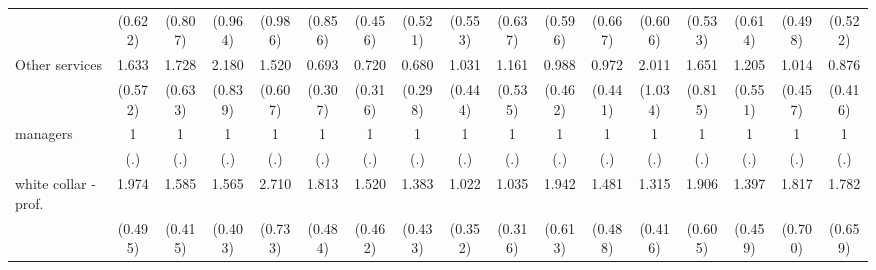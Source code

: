 {\begin{tabular}{l*{16}{c}}
                    &     (0.622)         &     (0.807)         &     (0.964)         &     (0.986)         &     (0.856)         &     (0.456)         &     (0.521)         &     (0.553)         &     (0.637)         &     (0.596)         &     (0.667)         &     (0.606)         &     (0.533)         &     (0.614)         &     (0.498)         &     (0.522)         \\
[1em]
Other services      &       1.633         &       1.728         &       2.180\sym{*}  &       1.520         &       0.693         &       0.720         &       0.680         &       1.031         &       1.161         &       0.988         &       0.972         &       2.011         &       1.651         &       1.205         &       1.014         &       0.876         \\
                    &     (0.572)         &     (0.633)         &     (0.839)         &     (0.607)         &     (0.307)         &     (0.316)         &     (0.298)         &     (0.444)         &     (0.535)         &     (0.462)         &     (0.441)         &     (1.034)         &     (0.815)         &     (0.551)         &     (0.457)         &     (0.416)         \\
[1em]
managers            &           1         &           1         &           1         &           1         &           1         &           1         &           1         &           1         &           1         &           1         &           1         &           1         &           1         &           1         &           1         &           1         \\
                    &         (.)         &         (.)         &         (.)         &         (.)         &         (.)         &         (.)         &         (.)         &         (.)         &         (.)         &         (.)         &         (.)         &         (.)         &         (.)         &         (.)         &         (.)         &         (.)         \\
[1em]
white collar - prof.&       1.974\sym{**} &       1.585         &       1.565         &       2.710\sym{***}&       1.813\sym{*}  &       1.520         &       1.383         &       1.022         &       1.035         &       1.942\sym{*}  &       1.481         &       1.315         &       1.906\sym{*}  &       1.397         &       1.817         &       1.782         \\
                    &     (0.495)         &     (0.415)         &     (0.403)         &     (0.733)         &     (0.484)         &     (0.462)         &     (0.433)         &     (0.352)         &     (0.316)         &     (0.613)         &     (0.488)         &     (0.416)         &     (0.605)         &     (0.459)         &     (0.700)         &     (0.659)         \\

\end{tabular}}
